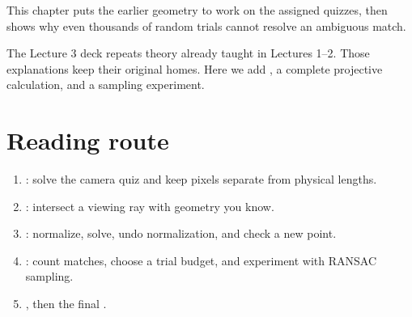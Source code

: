 \documentclass[letterpaper,11pt,english,openany,oneside]{jupyterBook}
\begin{document}
\sphinxAtStartPar
{} This chapter puts the earlier geometry to work on the assigned quizzes, then shows why even thousands of random trials cannot resolve an ambiguous match.

\sphinxAtStartPar
The Lecture 3 deck repeats theory already taught in Lectures 1–2. Those explanations keep their original homes. Here we add , a complete projective calculation, and a sampling experiment.


\section{Reading route}
\label{\detokenize{lectures/lecture03/index:reading-route}}\begin{enumerate}
%
\item {}
\sphinxAtStartPar
{\hyperref[\detokenize{lectures/lecture03/calibration::doc}]{}}: solve the camera quiz and keep pixels separate from physical lengths.

\item {}
\sphinxAtStartPar
{\hyperref[\detokenize{lectures/lecture03/ray-plane::doc}]{}}: intersect a viewing ray with geometry you know.

\item {}
\sphinxAtStartPar
{\hyperref[\detokenize{lectures/lecture03/homography-practice::doc}]{}}: normalize, solve, undo normalization, and check a new point.

\item {}
\sphinxAtStartPar
{\hyperref[\detokenize{lectures/lecture03/probability-ransac::doc}]{}}: count matches, choose a trial budget, and experiment with RANSAC sampling.

\item {}
\sphinxAtStartPar
{\hyperref[\detokenize{lectures/lecture03/review::doc}]{}}, then the final {\hyperref[\detokenize{lectures/lecture03/tldr::doc}]{}}.

\end{enumerate}
\end{document}
